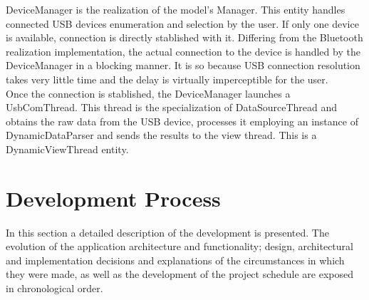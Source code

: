 			DeviceManager is the realization of the model's Manager. This entity handles connected USB devices enumeration and selection by the user. If only one device is available, connection is directly stablished with it. Differing from the Bluetooth realization implementation, the actual connection to the device is handled by the DeviceManager in a blocking manner. It is so because USB connection resolution takes very little time and the delay is virtually imperceptible for the user.\\

			Once the connection is stablished, the DeviceManager launches a UsbComThread. This thread is the specialization of DataSourceThread and obtains the raw data from the USB device, processes it employing an instance of DynamicDataParser and sends the results to the view thread. This is a DynamicViewThread entity.

	\section{Development Process}
	\label{sec:sw-process}

		In this section a detailed description of the development is presented. The evolution of the application architecture and functionality; design, architectural and implementation decisions and explanations of the circumstances in which they were made, as well as the development of the project schedule are exposed in chronological order.\\

